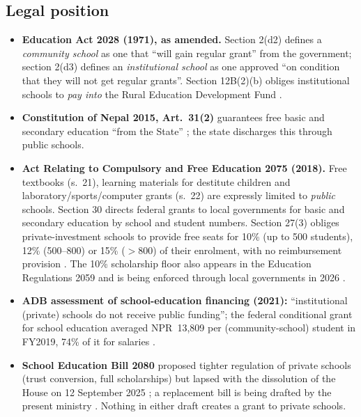 \documentclass[11pt,a4paper]{article}
\begin{document}
\subsection{Legal position}
\begin{itemize}[leftmargin=1.4em]
\item \textbf{Education Act 2028 (1971), as amended.} Section 2(d2) defines a \emph{community school} as one that ``will gain regular grant'' from the government; section 2(d3) defines an \emph{institutional school} as one approved ``on condition that they will not get regular grants''. Section 12B(2)(b) obliges institutional schools to \emph{pay into} the Rural Education Development Fund \cite{eduact1971}.
\item \textbf{Constitution of Nepal 2015, Art.~31(2)} guarantees free basic and secondary education ``from the State'' \cite{constitution2015}; the state discharges this through public schools.
\item \textbf{Act Relating to Compulsory and Free Education 2075 (2018).} Free textbooks (s.~21), learning materials for destitute children and laboratory/sports/computer grants (s.~22) are expressly limited to \emph{public} schools. Section 30 directs federal grants to local governments for basic and secondary education by school and student numbers. Section 27(3) obliges private-investment schools to provide free seats for 10\% (up to 500 students), 12\% (500--800) or 15\% ($>$800) of their enrolment, with no reimbursement provision \cite{cfe2018}. The 10\% scholarship floor also appears in the Education Regulations 2059 and is being enforced through local governments in 2026 \cite{kp2026scholar}.
\item \textbf{ADB assessment of school-education financing (2021):} ``institutional (private) schools do not receive public funding''; the federal conditional grant for school education averaged NPR~13,809 per (community-school) student in FY2019, 74\% of it for salaries \cite{adb2021}.
\item \textbf{School Education Bill 2080} proposed tighter regulation of private schools (trust conversion, full scholarships) but lapsed with the dissolution of the House on 12 September 2025 \cite{himalpress2025}; a replacement bill is being drafted by the present ministry \cite{kp2026bill}. Nothing in either draft creates a grant to private schools.
\end{itemize}
\end{document}
